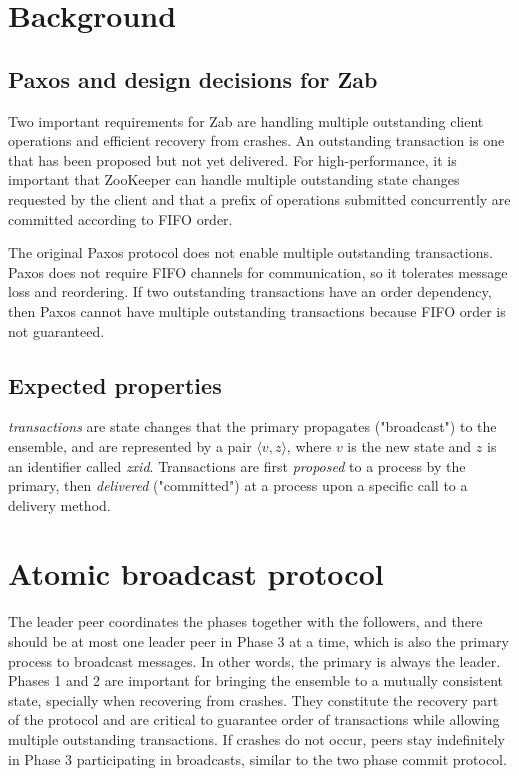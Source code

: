 \documentclass[10pt,onecolumn]{article}
\begin{document}
\section{Background} \label{sec:background}
\subsection{Paxos and design decisions for Zab}
Two important requirements for Zab are handling multiple outstanding client operations and efficient recovery from crashes. An outstanding transaction is one that has been proposed but not yet delivered. For high-performance, it is important that ZooKeeper can handle multiple outstanding state changes requested by the client and that a prefix of operations submitted concurrently are committed according to FIFO order.

The original Paxos protocol does not enable multiple outstanding transactions. Paxos does not require FIFO channels for communication, so it tolerates message loss and reordering. If two outstanding transactions have an order dependency, then Paxos cannot have multiple outstanding transactions because FIFO order is not guaranteed.

\subsection{Expected properties} \label{sec:property}
\emph{transactions} are state changes that the primary propagates ("broadcast") to the ensemble, and are represented by a pair $ \langle v,z \rangle$, where $v$ is the new state and $z$ is an identifier called \emph{zxid}. Transactions are first \emph{proposed} to a process by the primary, then \emph{delivered} ("committed") at a process upon a specific call to a delivery method.

\section{Atomic broadcast protocol} \label{sec:protocol}
The leader peer coordinates the phases together with the followers, and there should be at most one leader peer in Phase 3 at a time, which is also the primary process to broadcast messages. In other words, the primary is always the leader. Phases 1 and 2 are important for bringing the ensemble to a mutually consistent state, specially when recovering from crashes. They constitute the recovery part of the protocol and are critical to guarantee order of transactions while allowing multiple outstanding transactions. If crashes do not occur, peers stay indefinitely in Phase 3 participating in broadcasts, similar to the two phase commit protocol. 
\end{document}
